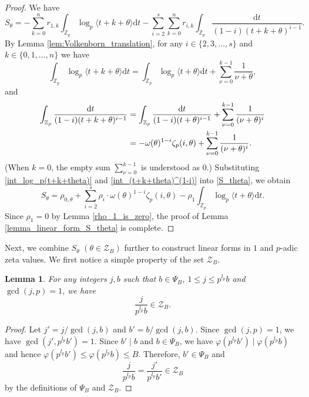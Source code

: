 \documentclass[12pt]{article}
\newtheorem{lemma}[theorem]{Lemma}
\numberwithin{equation}{section}
\begin{document}
\begin{proof}
We have 
\begin{equation}\label{S_theta}
S_{\theta} = -\sum_{k=0}^{n} r_{1,k}\int_{\mathbb{Z}_p} \log_p\langle t+k+\theta \rangle \mathrm{d}t - \sum_{i=2}^{s}\sum_{k=0}^{n} r_{i,k}\int_{\mathbb{Z}_p} \frac{\mathrm{d}t}{(1-i)(t+k+\theta)^{i-1}}.
\end{equation}
By Lemma \ref{lem:Volkenborn_translation}, for any $i\in\{2,3,\ldots,s\}$ and $k \in \{0,1,\ldots,n\}$ we have
\begin{equation}\label{int_log_p(t+k+theta)}
\int_{\mathbb{Z}_p} \log_p\langle t+k+\theta \rangle \mathrm{d}t = \int_{\mathbb{Z}_p} \log_p\langle t+\theta \rangle \mathrm{d}t + \sum_{\nu=0}^{k-1} \frac{1}{\nu +\theta}, 
\end{equation}
and
\begin{align}
\int_{\mathbb{Z}_p}\frac{\mathrm{d}t}{(1-i)(t+k+\theta)^{i-1}} &= \int_{\mathbb{Z}_p}\frac{\mathrm{d}t}{(1-i)(t+\theta)^{i-1}} + \sum_{\nu=0}^{k-1} \frac{1}{(\nu+\theta)^{i}} \notag\\
&= -\omega(\theta)^{1-i}\zeta_p(i,\theta) + \sum_{\nu=0}^{k-1} \frac{1}{(\nu+\theta)^{i}}. \label{int_(t+k+theta)^(1-i)}
\end{align}
(When $k=0$, the empty sum $\sum_{\nu=0}^{k-1}$ is understood as $0$.) Substituting \eqref{int_log_p(t+k+theta)} and \eqref{int_(t+k+theta)^(1-i)} into \eqref{S_theta}, we obtain
\[ S_{\theta} = \rho_{0,\theta} + \sum_{i=2}^s \rho_i \cdot \omega(\theta)^{1-i}\zeta_p(i,\theta) - \rho_1 \int_{\mathbb{Z}_p} \log_p\langle t+\theta \rangle \mathrm{d}t. \]
Since $\rho_1 = 0$ by Lemma \ref{rho_1_is_zero}, the proof of Lemma \ref{lemma_linear_form_S_theta} is complete.
\end{proof}





Next, we combine $S_{\theta}$ $(\theta \in \mathcal{Z}_B)$ further to construct linear forms in $1$ and $p$-adic zeta values. We first notice a simple property of the set $\mathcal{Z}_B$.

\begin{lemma}\label{lemma_a_simple_property_of_Z_B}
For any integers $j,b$ such that $b \in \Psi_B$, $1 \leqslant j \leqslant p^{l_p}b$ and $\gcd(j,p)=1$, we have 
\[  \frac{j}{p^{l_p}b} \in \mathcal{Z}_B. \]
\end{lemma}

\begin{proof}
Let $j' =j/\gcd(j,b)$ and $b'=b/\gcd(j,b)$. Since $\gcd(j,p)=1$, we have $\gcd(j',p^{l_p}b')=1$. Since $b' \mid b$ and $b \in \Psi_B$, we have $\varphi(p^{l_p}b') \mid \varphi(p^{l_p}b)$ and hence $\varphi(p^{l_p}b') \leqslant  \varphi(p^{l_p}b) \leqslant B$. Therefore, $b' \in \Psi_B$ and 
\[ \frac{j}{p^{l_p}b} = \frac{j'}{p^{l_p}b'} \in \mathcal{Z}_B \]
by the definitions of $\Psi_B$ and $\mathcal{Z}_B$.
\end{proof}
\end{document}
